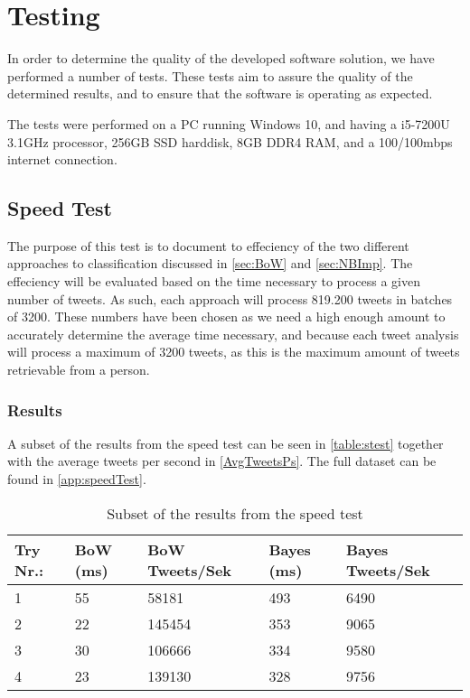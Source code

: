 \chapter{Testing}\label{cha:testing}
In order to determine the quality of the developed software solution, we have
performed a number of tests. These tests aim to assure the quality of the
determined results, and to ensure that the software is operating as expected.\nl

The tests were performed on a PC running Windows 10, and having a i5-7200U
3.1GHz processor, 256GB SSD harddisk, 8GB DDR4 RAM, and a 100/100mbps internet
connection.




\section{Speed Test}\label{speedtestlavel}
The purpose of this test is to document to effeciency of the two different
approaches to classification discussed in \autoref{sec:BoW} and
\autoref{sec:NBImp}. The effeciency will be evaluated based on the time
necessary to process a given number of tweets. As such, each approach will
process 819.200 tweets in batches of 3200. These numbers have been chosen as we
need a high enough amount to accurately determine the average time necessary,
and because each tweet analysis will process a maximum of 3200 tweets, as this
is the maximum amount of tweets retrievable from a person.

\subsection*{Results}
A subset of the results from the speed test can be seen in \autoref{table:stest}
together with the average tweets per second in \autoref{AvgTweetsPs}. The
full dataset can be found in \autoref{app:speedTest}.

\begin{table}[H]\centering
\begin{tabular}{|l|l|l|l|l|}
\hline
Try Nr.:	&	BoW (ms)	&	BoW Tweets/Sek	&	Bayes (ms)	&	Bayes Tweets/Sek	\\\hline
1	&	55	&	58181	&	493	&	6490 \\\hline
2	&	22	&	145454	&	353	&	9065 \\\hline
3	&	30	&	106666	&	334	&	9580 \\\hline
4	&	23	&	139130	&	328	&	9756 \\\hline		
\end{tabular}
\caption{Subset of the results from the speed test}
\label{table:stest}
\end{table}

